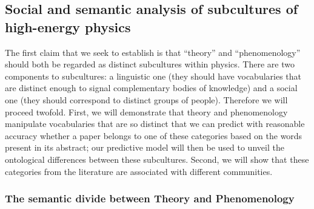 \documentclass[smallextended]{svjour3}
\begin{document}
\subsection{Social and semantic analysis of subcultures of high-energy physics}\label{section:method_subcultures}

The first claim that we seek to establish is that ``theory'' and ``phenomenology'' should both be regarded as distinct subcultures within physics. There are two components to subcultures: a linguistic one (they should have vocabularies that are distinct enough to signal complementary bodies of knowledge) and a social one (they should correspond to distinct groups of people). Therefore we will proceed twofold. First, we will demonstrate that theory and phenomenology manipulate vocabularies that are so distinct that we can predict with reasonable accuracy whether a paper belongs to one of these categories based on the words present in its abstract; our predictive model will then be used to unveil the ontological differences between these subcultures. Second, we will show that these categories from the literature are associated with different communities.

\subsubsection{The semantic divide between Theory and Phenomenology}
\end{document}

